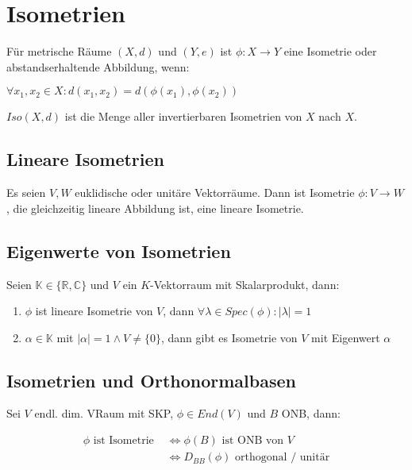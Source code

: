 \section*{Isometrien}

Für metrische Räume $(X, d)$ und $(Y, e)$ ist $\phi : X \rightarrow Y$ eine Isometrie oder abstandserhaltende Abbildung, wenn:

$\forall x_1, x_2 \in X : d(x_1, x_2) = d(\phi(x_1), \phi(x_2))$

$Iso(X, d)$ ist die Menge aller invertierbaren Isometrien von $X$ nach $X$.

\subsection*{Lineare Isometrien}

Es seien $V, W$ euklidische oder unitäre Vektorräume. Dann ist Isometrie $\phi : V \rightarrow W$, die gleichzeitig lineare Abbildung ist, eine lineare Isometrie.

\subsection*{Eigenwerte von Isometrien}

Seien $\mathbb{K} \in \{\mathbb{R}, \mathbb{C}\}$ und $V$ ein $K$-Vektorraum mit Skalarprodukt, dann:

\begin{enumerate}[label=(\alph*)]
	\item $\phi$ ist lineare Isometrie von $V$, dann $\forall \lambda \in Spec(\phi): |\lambda|=1$
	\item $\alpha \in \mathbb{K}$ mit $|\alpha|=1 \land V \neq \{0\}$, dann gibt es Isometrie von $V$ mit Eigenwert $\alpha$
\end{enumerate}

\subsection*{Isometrien und Orthonormalbasen}

Sei $V$ endl. dim. VRaum mit SKP, $\phi \in End(V)$ und $B$ ONB, dann:

\vspace*{-5mm}
\begin{align*}
	\phi \text{ ist Isometrie } &\Leftrightarrow \phi(B) \text{ ist ONB von } V \\
							    &\Leftrightarrow D_{BB}(\phi) \text{ orthogonal / unitär}
\end{align*}

